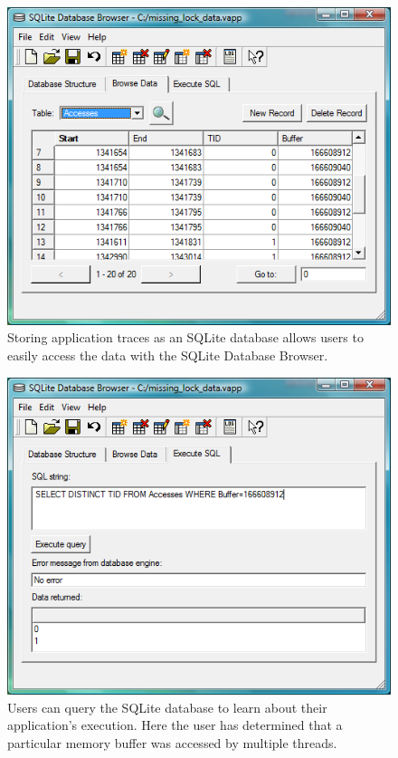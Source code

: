 \begin{figure}
  \includegraphics[width=\columnwidth]{sqlite_browse}
  \caption{Storing application traces as an SQLite database
  	allows users to easily access the data with the SQLite
  	Database Browser.}
  \label{pic:sqlite_browse}
\end{figure}


\begin{figure}
  \includegraphics[width=\columnwidth]{sqlite_query}
  \caption{Users can query the SQLite database to learn
  	about their application's execution.  Here the user
  	has determined that a particular memory buffer was
  	accessed by multiple threads.}
  \label{pic:sqlite_query}
\end{figure}


